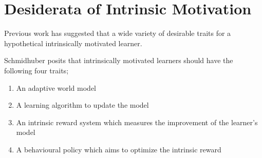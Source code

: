 \documentclass{article}
\begin{document}


\section{Desiderata of Intrinsic Motivation}

Previous work has suggested that a wide variety of desirable traits for a hypothetical intrinsically motivated learner.

Schmidhuber \cite{schmidhuber2010formal} posits that intrinsically motivated learners should have the following four traits;
\begin{enumerate}
\item An adaptive world model
\item A learning algorithm to update the model
\item An intrinsic reward system which measures the improvement of the learner's model
\item A behavioural policy which aims to optimize the intrinsic reward
\end{enumerate}
\end{document}
